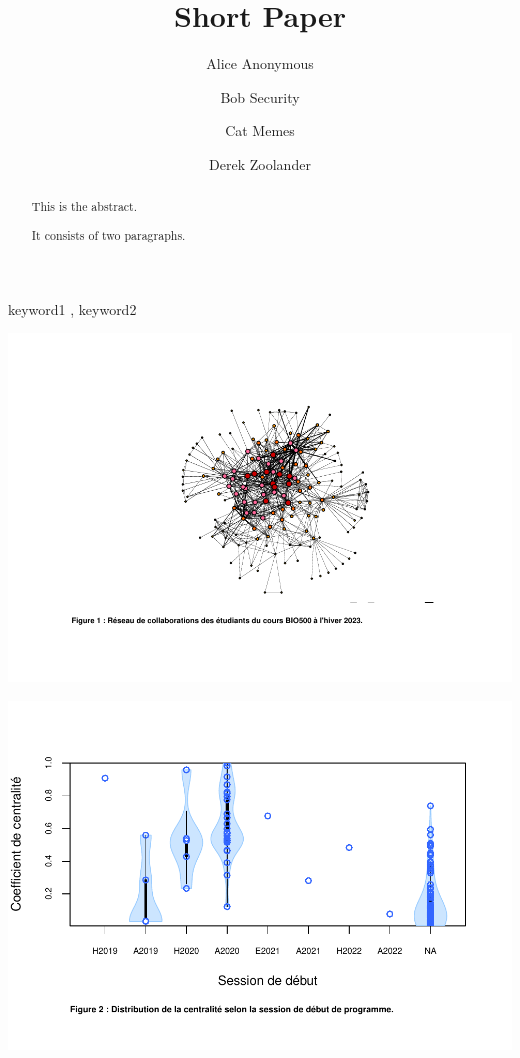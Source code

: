 \documentclass[preprint, 3p,
authoryear]{elsarticle} %
\begin{document}
\begin{frontmatter}

  \title{Short Paper}
    \author[Some Institute of Technology]{Alice Anonymous%
  }
    \author[Another University]{Bob Security%
  }
    \author[Another University]{Cat Memes%
  }
    \author[Some Institute of Technology]{Derek Zoolander%
  }
  
  \begin{abstract}
  This is the abstract.

  It consists of two paragraphs.
  \end{abstract}
    \begin{keyword}
    keyword1 \sep 
    keyword2
  \end{keyword}
  
 \end{frontmatter}

\includegraphics{rapport_final_files/figure-latex/unnamed-chunk-1-1.pdf}

\includegraphics{rapport_final_files/figure-latex/unnamed-chunk-2-1.pdf}
\end{document}
